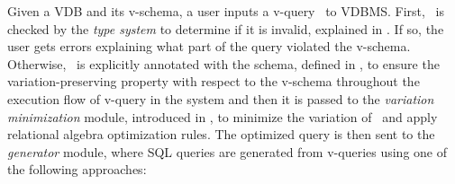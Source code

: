 Given a VDB and its v-schema, a user inputs a v-query \vQ\ to VDBMS.
%
First, \vQ\ is checked by the \emph{type system} to determine if it is invalid, explained in 
. 
If so, the user gets errors explaining what part of the 
query violated the v-schema.
Otherwise, 
\vQ\ is explicitly annotated with the schema,
defined in ,
to ensure the variation-preserving property with respect to the v-schema throughout the execution flow of v-query 
in the system and then
%
it is passed to the \emph{variation minimization} module, introduced in 
, to minimize the variation of \vQ\ and apply
relational algebra optimization rules. 
%
The optimized query is then sent to the \emph{generator} module, where
SQL queries are generated from v-queries using one of the following approaches:
